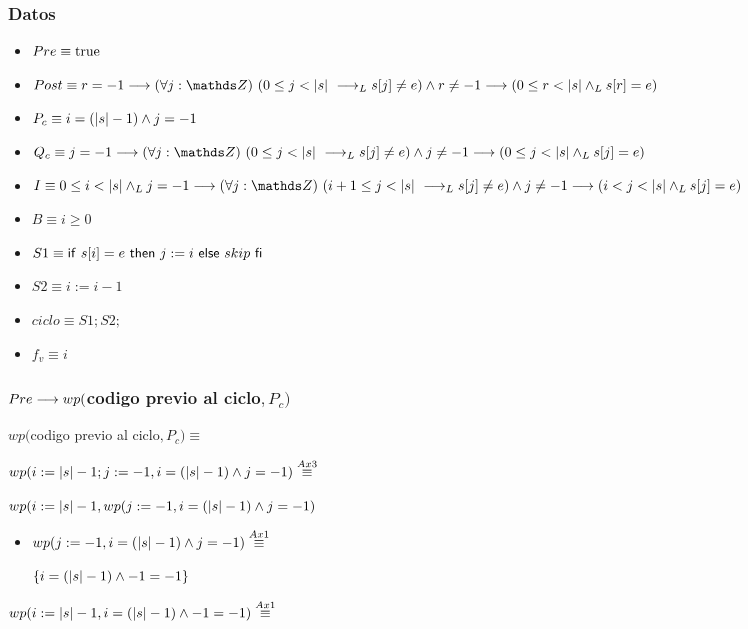 \documentclass{article}
\begin{document}
\subsubsection*{Datos}
\begin{itemize}
    \item $Pre      \equiv \mathrm{true}$
    \item $Post     \equiv r = -1 \implica \paraTodo{j}{(0}{\longitud{s}} \implicaLuego s[j] \neq e) \wedge r \neq -1 \implica (0 \leq r < \longitud{s}\yLuego s[r]=e)$
    \item $P_{c}    \equiv i = (|s| - 1) \wedge j = -1 $
    \item $Q_{c}    \equiv j = -1 \implica \paraTodo{j}{(0}{\longitud{s}} \implicaLuego s[j] \neq e) \wedge j \neq -1 \implica (0 \leq j < \longitud{s}\yLuego s[j]=e)$
    \item $I        \equiv 0 \leq i < \longitud{s} \yLuego j = -1 \implica \paraTodo{j}{(i+1}{\longitud{s}} \implicaLuego s[j] \neq e) \wedge j \neq -1 \implica (i < j < \longitud{s} \yLuego s[j]=e)$
    \item $B        \equiv i \geq 0$
    \item $S1       \equiv \mathsf{if}\ s[i]=e\ \mathsf{then}\ j:=i\ \mathsf{else}\ skip\ \mathsf{fi}$
    \item $S2       \equiv i:= i - 1$
    \item $ciclo    \equiv S1;S2;$
    \item $f_{v}    \equiv i$
\end{itemize}

\subsubsection*{$Pre \longrightarrow wp($codigo previo al ciclo$, P_{c})$}

$wp($codigo previo al ciclo$, P_{c}) \equiv$

$wp(i:= |s|-1;j:= -1, i = (|s| - 1) \wedge j = -1) \stackrel{Ax3}{\equiv}$

$wp(i:= |s|-1, wp(j:= -1, i = (|s| - 1) \wedge j = -1) $

\begin{itemize}
    \item $wp(j:= -1, i = (|s| - 1) \wedge j = -1)\stackrel{Ax1}{\equiv}$

    $ \{ i = (|s| - 1) \wedge -1 = -1 \} $
\end{itemize}

$wp(i:= |s|-1, i = (|s| - 1) \wedge -1 = -1) \stackrel{Ax1}{\equiv}$
\end{document}
